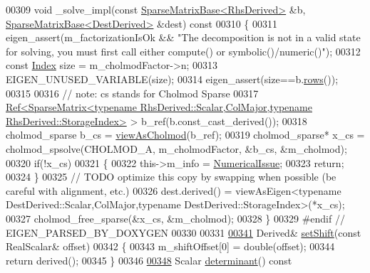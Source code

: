 \begin{DoxyCode}
00309     \textcolor{keywordtype}{void} \_solve\_impl(\textcolor{keyword}{const} \hyperlink{group___sparse_core___module_class_eigen_1_1_sparse_matrix_base}{SparseMatrixBase<RhsDerived>} &b, 
      \hyperlink{group___sparse_core___module_class_eigen_1_1_sparse_matrix_base}{SparseMatrixBase<DestDerived>} &dest)\textcolor{keyword}{ const}
00310 \textcolor{keyword}{    }\{
00311       eigen\_assert(m\_factorizationIsOk && \textcolor{stringliteral}{"The decomposition is not in a valid state for solving, you must
       first call either compute() or symbolic()/numeric()"});
00312       \textcolor{keyword}{const} \hyperlink{namespace_eigen_a62e77e0933482dafde8fe197d9a2cfde}{Index} size = m\_cholmodFactor->n;
00313       EIGEN\_UNUSED\_VARIABLE(size);
00314       eigen\_assert(size==b.\hyperlink{group___sparse_core___module_a1944e9fa9ce7937bfc3a87b2cb94371f}{rows}());
00315 
00316       \textcolor{comment}{// note: cs stands for Cholmod Sparse}
00317       
      \hyperlink{group___core___module_class_eigen_1_1_ref}{Ref<SparseMatrix<typename RhsDerived::Scalar,ColMajor,typename RhsDerived::StorageIndex>}
       > b\_ref(b.const\_cast\_derived());
00318       cholmod\_sparse b\_cs = \hyperlink{namespace_eigen_ac9fb9e40cfc9ddbdc7da84ee01bb7545}{viewAsCholmod}(b\_ref);
00319       cholmod\_sparse* x\_cs = cholmod\_spsolve(CHOLMOD\_A, m\_cholmodFactor, &b\_cs, &m\_cholmod);
00320       \textcolor{keywordflow}{if}(!x\_cs)
00321       \{
00322         this->m\_info = \hyperlink{group__enums_gga85fad7b87587764e5cf6b513a9e0ee5eaaf9b736d310a664e7729d163a035cc5f}{NumericalIssue};
00323         \textcolor{keywordflow}{return};
00324       \}
00325       \textcolor{comment}{// TODO optimize this copy by swapping when possible (be careful with alignment, etc.)}
00326       dest.derived() = viewAsEigen<typename DestDerived::Scalar,ColMajor,typename
       DestDerived::StorageIndex>(*x\_cs);
00327       cholmod\_free\_sparse(&x\_cs, &m\_cholmod);
00328     \}
00329 \textcolor{preprocessor}{    #endif // EIGEN\_PARSED\_BY\_DOXYGEN}
00330     
00331     
\hyperlink{class_eigen_1_1_cholmod_base_a886fc102723ca7bde4ac7162dfd72f5d}{00341}     Derived& \hyperlink{class_eigen_1_1_cholmod_base_a886fc102723ca7bde4ac7162dfd72f5d}{setShift}(\textcolor{keyword}{const} RealScalar& offset)
00342     \{
00343       m\_shiftOffset[0] = double(offset);
00344       \textcolor{keywordflow}{return} derived();
00345     \}
00346     
\hyperlink{class_eigen_1_1_cholmod_base_ab4ffb4a9735ad7e81a01d5789ce96547}{00348}     Scalar \hyperlink{class_eigen_1_1_cholmod_base_ab4ffb4a9735ad7e81a01d5789ce96547}{determinant}()\textcolor{keyword}{ const}

\end{DoxyCode}
